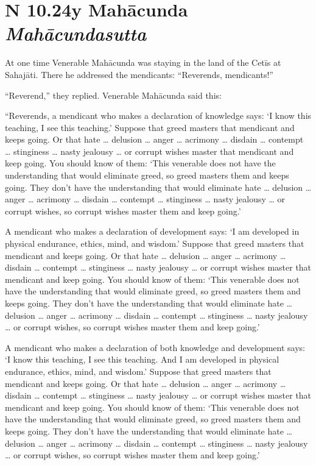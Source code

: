 \documentclass[12pt,openany]{book}%
\newcommand*{\suttatitleacronym}[1]{\smaller[2]{#1}\vspace*{.3em}}
\newcommand*{\suttatitletranslation}[1]{\linebreak{#1}}
\newcommand*{\suttatitleroot}[1]{\linebreak\smaller[2]\itshape{#1}}
\newcommand*{\tocacronym}[1]{\hspace*{-3.3em}{#1}\quad}
\newcommand*{\toctranslation}[1]{#1}
\newcommand*{\tocroot}[1]{(\textit{#1})}
\begin{document}
%
\section*{{\suttatitleacronym AN 10.24}{\suttatitletranslation By Mahācunda }{\suttatitleroot Mahācundasutta}}
\addcontentsline{toc}{section}{\tocacronym{AN 10.24} \toctranslation{By Mahācunda } \tocroot{Mahācundasutta}}

At one time Venerable \textsanskrit{Mahācunda} was staying in the land of the \textsanskrit{Cetīs} at \textsanskrit{Sahajāti}. There he addressed the mendicants: “Reverends, mendicants!” 

“Reverend,” they replied. Venerable \textsanskrit{Mahācunda} said this: 

“Reverends, a mendicant who makes a declaration of knowledge says: ‘I know this teaching, I see this teaching.’ Suppose that greed masters that mendicant and keeps going. Or that hate … delusion … anger … acrimony … disdain … contempt … stinginess … nasty jealousy … or corrupt wishes master that mendicant and keep going. You should know of them: ‘This venerable does not have the understanding that would eliminate greed, so greed masters them and keeps going. They don’t have the understanding that would eliminate hate … delusion … anger … acrimony … disdain … contempt … stinginess … nasty jealousy … or corrupt wishes, so corrupt wishes master them and keep going.’ 

A mendicant who makes a declaration of development says: ‘I am developed in physical endurance, ethics, mind, and wisdom.’ Suppose that greed masters that mendicant and keeps going. Or that hate … delusion … anger … acrimony … disdain … contempt … stinginess … nasty jealousy … or corrupt wishes master that mendicant and keep going. You should know of them: ‘This venerable does not have the understanding that would eliminate greed, so greed masters them and keeps going. They don’t have the understanding that would eliminate hate … delusion … anger … acrimony … disdain … contempt … stinginess … nasty jealousy … or corrupt wishes, so corrupt wishes master them and keep going.’ 

A mendicant who makes a declaration of both knowledge and development says: ‘I know this teaching, I see this teaching. And I am developed in physical endurance, ethics, mind, and wisdom.’ Suppose that greed masters that mendicant and keeps going. Or that hate … delusion … anger … acrimony … disdain … contempt … stinginess … nasty jealousy … or corrupt wishes master that mendicant and keep going. You should know of them: ‘This venerable does not have the understanding that would eliminate greed, so greed masters them and keeps going. They don’t have the understanding that would eliminate hate … delusion … anger … acrimony … disdain … contempt … stinginess … nasty jealousy … or corrupt wishes, so corrupt wishes master them and keep going.’ 
\end{document}
